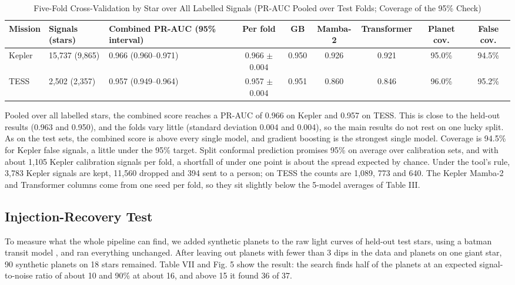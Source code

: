 \documentclass[conference,a4paper]{IEEEtran}
\begin{document}
\begin{table}[!t]
\caption{Five-Fold Cross-Validation by Star over All Labelled Signals (PR-AUC Pooled over Test Folds; Coverage of the 95\% Check)}
\centering\footnotesize\setlength{\tabcolsep}{4pt}
\begin{tabular}{lllcccccc}
\hline
\textbf{Mission} & \textbf{Signals (stars)} & \textbf{Combined PR-AUC (95\% interval)} & \textbf{Per fold} & \textbf{GB} & \textbf{Mamba-2} & \textbf{Transformer} & \textbf{Planet cov.} & \textbf{False cov.} \\
\hline
Kepler & 15,737 (9,865) & 0.966 (0.960--0.971) & 0.966 $\pm$ 0.004 & 0.950 & 0.926 & 0.921 & 95.0\% & 94.5\% \\
TESS & 2,502 (2,357) & 0.957 (0.949--0.964) & 0.957 $\pm$ 0.004 & 0.951 & 0.860 & 0.846 & 96.0\% & 95.2\% \\
\hline
\end{tabular}
\end{table}
Pooled over all labelled stars, the combined score reaches a PR-AUC of 0.966 on Kepler and 0.957 on TESS. This is close to the held-out results (0.963 and 0.950), and the folds vary little (standard deviation 0.004 and 0.004), so the main results do not rest on one lucky split. As on the test sets, the combined score is above every single model, and gradient boosting is the strongest single model. Coverage is 94.5\% for Kepler false signals, a little under the 95\% target. Split conformal prediction promises 95\% on average over calibration sets, and with about 1,105 Kepler calibration signals per fold, a shortfall of under one point is about the spread expected by chance. Under the tool's rule, 3,783 Kepler signals are kept, 11,560 dropped and 394 sent to a person; on TESS the counts are 1,089, 773 and 640. The Kepler Mamba-2 and Transformer columns come from one seed per fold, so they sit slightly below the 5-model averages of Table III.

\subsection{Injection-Recovery Test}
To measure what the whole pipeline can find, we added synthetic planets to the raw light curves of held-out test stars, using a batman transit model \cite{r18}, and ran everything unchanged. After leaving out planets with fewer than 3 dips in the data and planets on one giant star, 90 synthetic planets on 18 stars remained. Table VII and Fig. 5 show the result: the search finds half of the planets at an expected signal-to-noise ratio of about 10 and 90\% at about 16, and above 15 it found 36 of 37.
\end{document}
